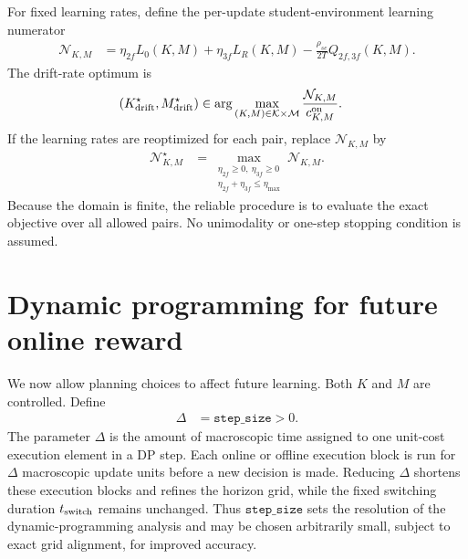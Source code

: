 \documentclass{article}
\begin{document}
For fixed learning rates, define the per-update student-environment learning numerator
\begin{align}
\mathcal N_{K,M} &= \eta_{2f}L_0(K,M)+\eta_{3f}L_R(K,M)-\frac{\rho_{se}}{2T}Q_{2f,3f}(K,M).
\end{align}
The drift-rate optimum is
\begin{align}
(K_{\rm drift}^\star,M_{\rm drift}^\star) &\in \arg\max_{(K,M)\in\mathcal K\times\mathcal M}\frac{\mathcal N_{K,M}}{c_{K,M}^{\rm on}}.
\end{align}
If the learning rates are reoptimized for each pair, replace $\mathcal N_{K,M}$ by
\begin{align}
\mathcal N_{K,M}^\star &= \max_{\substack{\eta_{2f}\geq0,\ \eta_{3f}\geq0 \\
\eta_{2f}+\eta_{3f}\leq\eta_{\max}}}\mathcal N_{K,M}.
\end{align}
Because the domain is finite, the reliable procedure is to evaluate the exact objective over all allowed pairs. No unimodality or one-step stopping condition is assumed.

\section{Dynamic programming for future online reward}

We now allow planning choices to affect future learning. Both $K$ and $M$ are controlled. Define
\begin{align}
\Delta &= \texttt{step\_size}>0.
\end{align}
The parameter $\Delta$ is the amount of macroscopic time assigned to one unit-cost execution element in a DP step. Each online or offline execution block is run for $\Delta$ macroscopic update units before a new decision is made. Reducing $\Delta$ shortens these execution blocks and refines the horizon grid, while the fixed switching duration $t_{\rm switch}$ remains unchanged. Thus $\texttt{step\_size}$ sets the resolution of the dynamic-programming analysis and may be chosen arbitrarily small, subject to exact grid alignment, for improved accuracy.
\end{document}
